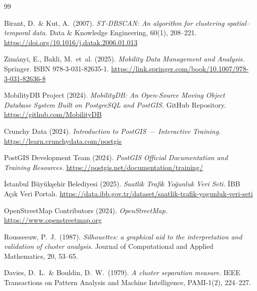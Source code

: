 \documentclass[12pt,a4paper]{article}
\begin{document}
\newpage
\begin{thebibliography}{99}

Birant, D.\ \& Kut, A.\ (2007).
\textit{ST-DBSCAN: An algorithm for clustering spatial--temporal data.}
Data \& Knowledge Engineering, 60(1), 208--221.
\url{https://doi.org/10.1016/j.datak.2006.01.013}

Zimányi, E., Bakli, M.\ et~al. (2025).
\textit{Mobility Data Management and Analysis.}
Springer. ISBN 978-3-031-82635-1.
\url{https://link.springer.com/book/10.1007/978-3-031-82636-8}

MobilityDB Project (2024).
\textit{MobilityDB: An Open-Source Moving Object Database System Built on PostgreSQL and PostGIS.}
GitHub Repository.
\url{https://github.com/MobilityDB}

Crunchy Data (2024).
\textit{Introduction to PostGIS — Interactive Training.}
\url{https://learn.crunchydata.com/postgis}

PostGIS Development Team (2024).
\textit{PostGIS Official Documentation and Training Resources.}
\url{https://postgis.net/documentation/training/}

İstanbul Büyükşehir Belediyesi (2025).
\textit{Saatlik Trafik Yoğunluk Veri Seti.}
İBB Açık Veri Portalı.
\url{https://data.ibb.gov.tr/dataset/saatlik-trafik-yogunluk-veri-seti}

OpenStreetMap Contributors (2024).
\textit{OpenStreetMap.}
\url{https://www.openstreetmap.org}

Rousseeuw, P.~J.\ (1987).
\textit{Silhouettes: a graphical aid to the interpretation and validation of cluster analysis.}
Journal of Computational and Applied Mathematics, 20, 53--65.

Davies, D.~L.\ \& Bouldin, D.~W.\ (1979).
\textit{A cluster separation measure.}
IEEE Transactions on Pattern Analysis and Machine Intelligence, PAMI-1(2), 224--227.

\end{thebibliography}
\end{document}
